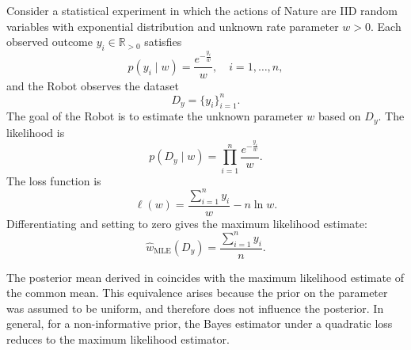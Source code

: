 \begin{example}
	\label{ex:exponential_mle}
	Consider a statistical experiment in which the actions of Nature are IID random variables with exponential distribution and unknown rate parameter $w>0$. Each observed outcome $y_i \in \mathbb{R}_{>0}$ satisfies
	\begin{equation}
		p(y_i \mid w) = \frac{e^{-\frac{y_i}{w}}}{w}, \quad i = 1, \dots, n,
	\end{equation}
	and the Robot observes the dataset
	\begin{equation}
		D_y = \{y_i\}_{i=1}^n.
	\end{equation}
	The goal of the Robot is to estimate the unknown parameter $w$ based on $D_y$. The likelihood is
	\begin{equation}
		p(D_y \mid w) = \prod_{i=1}^n \frac{e^{-\frac{y_i}{w}}}{w}.
	\end{equation}
	The loss function is
	\begin{equation}
		\ell(w) = \frac{\sum_{i=1}^n y_i}{w}-n \ln w.
	\end{equation}
	Differentiating and setting to zero gives the maximum likelihood estimate:
	\begin{equation}
		\hat{w}_{\mathrm{MLE}}(D_y) = \frac{\sum_{i=1}^n y_i}{n}.
	\end{equation}
\end{example}

\begin{example}
	The posterior mean derived in  coincides with the maximum likelihood estimate of the common mean. This equivalence arises because the prior on the parameter was assumed to be uniform, and therefore does not influence the posterior. In general, for a non-informative prior, the Bayes estimator under a quadratic loss reduces to the maximum likelihood estimator.
\end{example}

